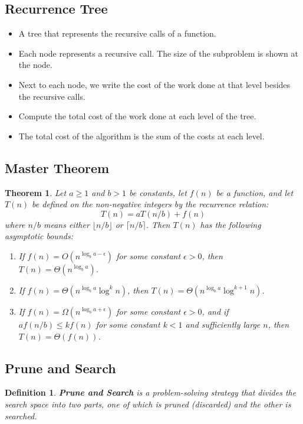 \documentclass[11pt,fleqn]{article}
\newtheorem*{theorem}{Theorem}
\newtheorem*{definition}{Definition}
\begin{document}
\subsection{Recurrence Tree}
\begin{itemize}
    \item A tree that represents the recursive calls of a function.
    \item Each node represents a recursive call. The size of the subproblem is shown at the node.
    \item Next to each node, we write the cost of the work done at that level besides the recursive calls.
    \item Compute the total cost of the work done at each level of the tree.
    \item The total cost of the algorithm is the sum of the costs at each level.
\end{itemize}

\subsection{Master Theorem}
\begin{theorem}
    Let $a \geq 1$ and $b > 1$ be constants, let $f(n)$ be a function, and let $T(n)$ be defined on the non-negative integers by the recurrence relation: \[
        T(n) = aT(n/b) + f(n)
    \]
    where $n/b$ means either $\lfloor n/b \rfloor$ or $\lceil n/b \rceil$. Then $T(n)$ has the following asymptotic bounds: \begin{enumerate}
        \item If $f(n) = O(n^{\log_b a - \epsilon})$ for some constant $\epsilon > 0$, then $T(n) = \Theta(n^{\log_b a})$.
        \item If $f(n) = \Theta(n^{\log_b a} \log^k n)$, then $T(n) = \Theta(n^{\log_b a} \log^{k+1} n)$.
        \item If $f(n) = \Omega(n^{\log_b a + \epsilon})$ for some constant $\epsilon > 0$, and if $a f(n/b) \leq k f(n)$ for some constant $k < 1$ and sufficiently large $n$, then $T(n) = \Theta(f(n))$.
    \end{enumerate}
\end{theorem}

\subsection{Prune and Search}

\begin{definition}
    \textbf{Prune and Search} is a problem-solving strategy that divides the search space into two parts, one of which is pruned (discarded) and the other is searched.
\end{definition}
\end{document}
